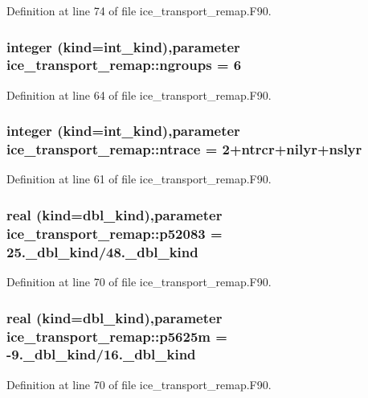 Definition at line 74 of file ice\_\-transport\_\-remap.F90.\hypertarget{namespaceice__transport__remap_a66c26988d6a99e211fdc9fd6cb9025c6}{
\subsubsection[{ngroups}]{\setlength{\rightskip}{0pt plus 5cm}integer (kind=int\_\-kind),parameter {\bf ice\_\-transport\_\-remap::ngroups} = 6}}
\label{namespaceice__transport__remap_a66c26988d6a99e211fdc9fd6cb9025c6}


Definition at line 64 of file ice\_\-transport\_\-remap.F90.\hypertarget{namespaceice__transport__remap_a5012cc594b512eddae2a80fd91132217}{
\subsubsection[{ntrace}]{\setlength{\rightskip}{0pt plus 5cm}integer (kind=int\_\-kind),parameter {\bf ice\_\-transport\_\-remap::ntrace} = 2+ntrcr+nilyr+nslyr}}
\label{namespaceice__transport__remap_a5012cc594b512eddae2a80fd91132217}


Definition at line 61 of file ice\_\-transport\_\-remap.F90.\hypertarget{namespaceice__transport__remap_a61fb7fc0ff741aea883e70089a6f0ea8}{
\subsubsection[{p52083}]{\setlength{\rightskip}{0pt plus 5cm}real (kind=dbl\_\-kind),parameter {\bf ice\_\-transport\_\-remap::p52083} = 25.\_\-dbl\_\-kind/48.\_\-dbl\_\-kind}}
\label{namespaceice__transport__remap_a61fb7fc0ff741aea883e70089a6f0ea8}


Definition at line 70 of file ice\_\-transport\_\-remap.F90.\hypertarget{namespaceice__transport__remap_a4571153ae2d02f5b5251863d6bdabc37}{
\subsubsection[{p5625m}]{\setlength{\rightskip}{0pt plus 5cm}real (kind=dbl\_\-kind),parameter {\bf ice\_\-transport\_\-remap::p5625m} = -\/9.\_\-dbl\_\-kind/16.\_\-dbl\_\-kind}}
\label{namespaceice__transport__remap_a4571153ae2d02f5b5251863d6bdabc37}


Definition at line 70 of file ice\_\-transport\_\-remap.F90.